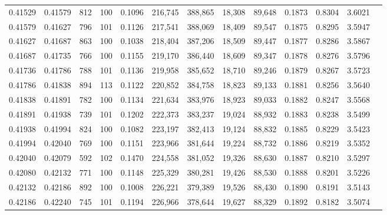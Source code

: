 \begin{tabular}{rrrrrrrrrrrrr}
0.41529 & 0.41579 &   812 & 100 &                                     0.1096 & 216,745 & 388,865 &  18,308 &  89,648 & 0.1873 & 0.8304 & 3.6021 \\
0.41579 & 0.41627 &   796 & 101 &                                     0.1126 & 217,541 & 388,069 &  18,409 &  89,547 & 0.1875 & 0.8295 & 3.5947 \\
0.41627 & 0.41687 &   863 & 100 &                                     0.1038 & 218,404 & 387,206 &  18,509 &  89,447 & 0.1877 & 0.8286 & 3.5867 \\
0.41687 & 0.41735 &   766 & 100 &                                     0.1155 & 219,170 & 386,440 &  18,609 &  89,347 & 0.1878 & 0.8276 & 3.5796 \\
0.41736 & 0.41786 &   788 & 101 &                                     0.1136 & 219,958 & 385,652 &  18,710 &  89,246 & 0.1879 & 0.8267 & 3.5723 \\
0.41786 & 0.41838 &   894 & 113 &                                     0.1122 & 220,852 & 384,758 &  18,823 &  89,133 & 0.1881 & 0.8256 & 3.5640 \\
0.41838 & 0.41891 &   782 & 100 &                                     0.1134 & 221,634 & 383,976 &  18,923 &  89,033 & 0.1882 & 0.8247 & 3.5568 \\
0.41891 & 0.41938 &   739 & 101 &                                     0.1202 & 222,373 & 383,237 &  19,024 &  88,932 & 0.1883 & 0.8238 & 3.5499 \\
0.41938 & 0.41994 &   824 & 100 &                                     0.1082 & 223,197 & 382,413 &  19,124 &  88,832 & 0.1885 & 0.8229 & 3.5423 \\
0.41994 & 0.42040 &   769 & 100 &                                     0.1151 & 223,966 & 381,644 &  19,224 &  88,732 & 0.1886 & 0.8219 & 3.5352 \\
0.42040 & 0.42079 &   592 & 102 &                                     0.1470 & 224,558 & 381,052 &  19,326 &  88,630 & 0.1887 & 0.8210 & 3.5297 \\
0.42080 & 0.42132 &   771 & 100 &                                     0.1148 & 225,329 & 380,281 &  19,426 &  88,530 & 0.1888 & 0.8201 & 3.5226 \\
0.42132 & 0.42186 &   892 & 100 &                                     0.1008 & 226,221 & 379,389 &  19,526 &  88,430 & 0.1890 & 0.8191 & 3.5143 \\
0.42186 & 0.42240 &   745 & 101 &                                     0.1194 & 226,966 & 378,644 &  19,627 &  88,329 & 0.1892 & 0.8182 & 3.5074 \\

\end{tabular}
